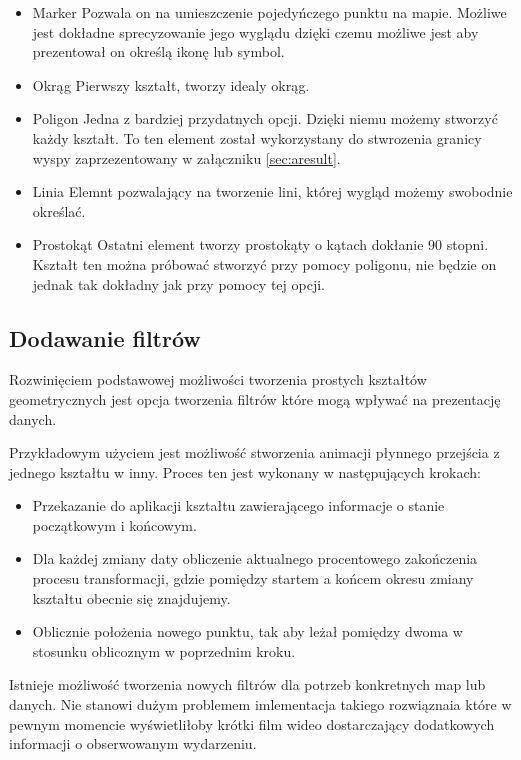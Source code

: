 \begin{itemize}
\item
Marker
Pozwala on na umieszczenie pojedyńczego punktu na mapie. Możliwe jest dokładne sprecyzowanie jego wyglądu dzięki czemu możliwe jest aby prezentował on określą ikonę lub symbol.
\item
Okrąg
Pierwszy kształt, tworzy idealy okrąg.
\item
Poligon
Jedna z bardziej przydatnych opcji. Dzięki niemu możemy stworzyć każdy kształt. To ten element został wykorzystany do stwrozenia granicy wyspy zaprzezentowany w załączniku \ref{sec:aresult}.
\item
Linia
Elemnt pozwalający na tworzenie lini, której wygląd możemy swobodnie określać.
\item
Prostokąt
Ostatni element tworzy prostokąty o kątach dokłanie 90 stopni. Kształt ten można próbować stworzyć przy pomocy poligonu, nie będzie on jednak tak dokładny jak przy pomocy tej opcji.

\end{itemize}

\subsection{Dodawanie filtrów}
\label{subsec:filters}

Rozwinięciem podstawowej możliwości tworzenia prostych kształtów geometrycznych jest opcja tworzenia filtrów które mogą wpływać na prezentację danych. 

Przykładowym użyciem jest możliwość stworzenia animacji płynnego przejścia z jednego kształtu w inny. Proces ten jest wykonany w następujących krokach:

\begin{itemize}
\item
Przekazanie do aplikacji kształtu zawierającego informacje o stanie początkowym i końcowym.
\item
Dla każdej zmiany daty obliczenie aktualnego procentowego zakończenia procesu transformacji, gdzie pomiędzy startem a końcem okresu zmiany kształtu obecnie się znajdujemy.
\item
Oblicznie położenia nowego punktu, tak aby leżał pomiędzy dwoma w stosunku oblicoznym w poprzednim kroku.
\end{itemize}

Istnieje możliwość tworzenia nowych filtrów dla potrzeb konkretnych map lub danych. Nie stanowi dużym problemem imlementacja takiego rozwiąznaia które w pewnym momencie wyświetliłoby krótki film wideo dostarczający dodatkowych informacji o obserwowanym wydarzeniu. 

